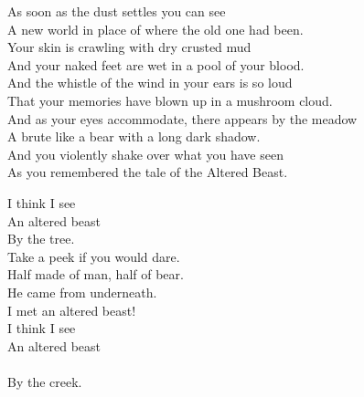 
\label{album:murder-of-the-universe}





As soon as the dust settles you can see \\
A new world in place of where the old one had been. \\

Your skin is crawling with dry crusted mud \\
And your naked feet are wet in a pool of your blood. \\

And the whistle of the wind in your ears is so loud \\
That your memories have blown up in a mushroom cloud. \\

And as your eyes accommodate, there appears by the meadow \\
A brute like a bear with a long dark shadow. \\

And you violently shake over what you have seen \\
As you remembered the tale of the Altered Beast. \\





I think I see \\
An altered beast \\
By the tree. \\

Take a peek if you would dare. \\
Half made of man, half of bear. \\

He came from underneath. \\
I met an altered beast! \\

I think I see \\
An altered beast \\ \\
By the creek. \\


